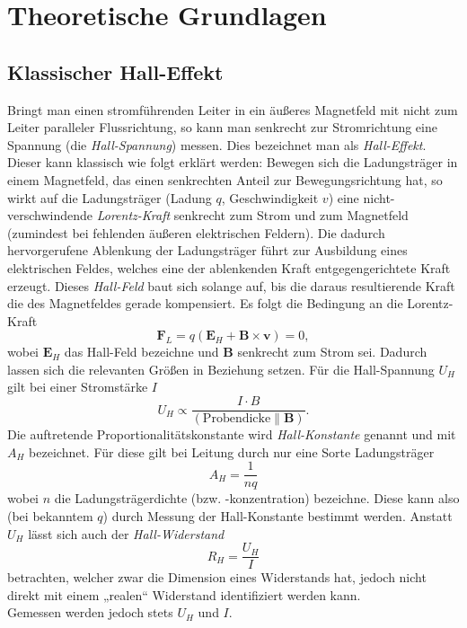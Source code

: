 \section{Theoretische Grundlagen}

\renewcommand{\V}[1]{\textbf{#1}}

\subsection{Klassischer Hall-Effekt}\label{sc:HallEffekt}

Bringt man einen stromführenden Leiter in ein äußeres Magnetfeld mit nicht zum Leiter paralleler Flussrichtung, so kann man senkrecht zur Stromrichtung eine Spannung (die \emph{Hall-Spannung}) messen. Dies bezeichnet man als \emph{Hall-Effekt}.
Dieser kann klassisch wie folgt erklärt werden:
Bewegen sich die Ladungsträger in einem Magnetfeld, das einen senkrechten Anteil zur Bewegungsrichtung hat, so wirkt auf die Ladungsträger (Ladung $q$, Geschwindigkeit $v$) eine nicht-verschwindende \emph{Lorentz-Kraft} senkrecht zum Strom und zum Magnetfeld (zumindest bei fehlenden äußeren elektrischen Feldern). Die dadurch hervorgerufene Ablenkung der Ladungsträger führt zur Ausbildung eines elektrischen Feldes, welches eine der ablenkenden Kraft entgegengerichtete Kraft erzeugt. Dieses \emph{Hall-Feld} baut sich solange auf, bis die daraus resultierende Kraft die des Magnetfeldes gerade kompensiert.
Es folgt die Bedingung an die Lorentz-Kraft
$$\V F_L = q(\V E_H + \V B\times \V v) = 0,$$
wobei $\V E_H$ das Hall-Feld bezeichne und $\V B$ senkrecht zum Strom sei.
Dadurch lassen sich die relevanten Größen in Beziehung setzen. Für die Hall-Spannung $U_H$ gilt bei einer Stromstärke $I$
\begin{equation}\label{eq:HallSpannung}
U_H\propto\frac{I\cdot B}{(\text{Probendicke}\parallel \V B)}.
\end{equation}
Die auftretende Proportionalitätskonstante wird \emph{Hall-Konstante} genannt und mit $A_H$ bezeichnet. Für diese gilt bei Leitung durch nur eine Sorte Ladungsträger
\begin{equation}
A_H = \frac{1}{nq}
\end{equation}
wobei $n$ die Ladungsträgerdichte (bzw. -konzentration) bezeichne. Diese kann also (bei
bekanntem $q$) durch Messung der Hall-Konstante bestimmt werden.
Anstatt $U_H$ lässt sich auch der \emph{Hall-Widerstand}
\begin{equation}\label{eq:HallWiderstand}
R_H = \frac{U_H}{I}
\end{equation}
betrachten, welcher zwar die Dimension eines Widerstands hat, jedoch nicht direkt mit einem „realen“ Widerstand identifiziert werden kann.\\
Gemessen werden jedoch stets $U_H$ und $I$.

